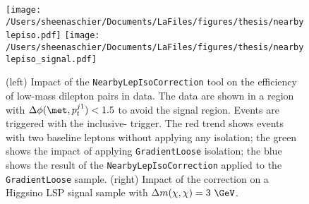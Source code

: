  \begin{figure}[tbp]
  \texttt{[image: /Users/sheenaschier/Documents/LaFiles/figures/thesis/nearbylepiso.pdf]}
   \texttt{[image: /Users/sheenaschier/Documents/LaFiles/figures/thesis/nearbylepiso\_signal.pdf]}
  \caption{(left) Impact of the \texttt{NearbyLepIsoCorrection} tool on the efficiency of low-mass dilepton pairs in data.  The data are shown in a region with $\Delta\phi(\met, p_{t}^{j1})<1.5$ to avoid the signal region.  Events are triggered with the inclusive-\met{} trigger.  The red trend shows events with two baseline leptons without applying any isolation; the green shows the impact of applying \texttt{GradientLoose} isolation; the blue shows the result of the \texttt{NearbyLepIsoCorrection} applied to the \texttt{GradientLoose} sample.  (right) Impact of the correction on a Higgsino LSP signal sample with $\Delta m(\chi,\chi)=3~\GeV$.}
 \label{fig:nearbylepiso}
 \end{figure}
 

 
 


